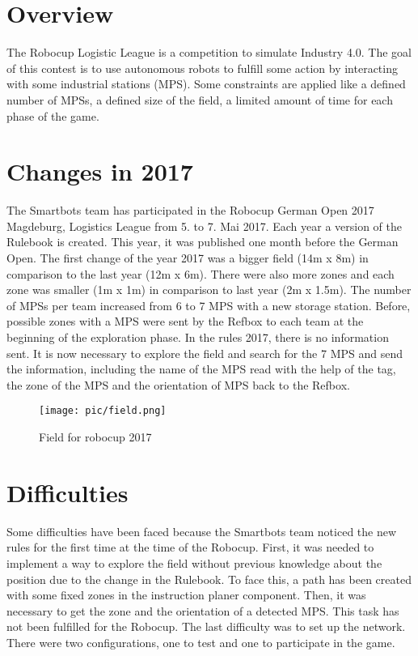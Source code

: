\section{Overview}

The Robocup Logistic League is a competition to simulate Industry 4.0.  The goal of this contest is to use autonomous robots to fulfill some action by interacting with some industrial stations (MPS). Some constraints are applied like a defined number of MPSs, a defined size of the field, a limited amount of time for each phase of the game. 

\section{Changes in 2017}

The Smartbots team has participated in the Robocup German Open 2017 Magdeburg, Logistics League from 5. to 7. Mai 2017. Each year a version of the Rulebook is created. This year, it was published one month before the German Open. The first change of the year 2017 was a bigger field (14m x 8m) in comparison to the last year (12m x 6m). There were also more zones and each zone was smaller (1m x 1m) in comparison to last year (2m x 1.5m). The number of MPSs per team increased from 6 to 7 MPS with a new storage station. Before, possible zones with a MPS were sent by the Refbox to each team at the beginning of the exploration phase. In the rules 2017, there is no information sent. It is now necessary to explore the field and search for the 7 MPS and send the information, including the name of the MPS read with the help of the tag, the zone of the MPS and the orientation of MPS back to the Refbox. 

\begin{figure}%
\centering
\texttt{[image: pic/field.png]}
\caption{Field for robocup 2017}
\label{fig:frog}
\end{figure}

\section{Difficulties}

Some difficulties have been faced because the Smartbots team noticed the new rules for the first time at the time of the Robocup. First, it was needed to implement a way to explore the field without previous knowledge about the position due to the change in the Rulebook. To face this, a path has been created with some fixed zones in the instruction planer component. Then, it was necessary to get the zone and the orientation of a detected MPS. This task has not been fulfilled for the Robocup. The last difficulty was to set up the network. There were two configurations, one to test and one to participate in the game.
 

